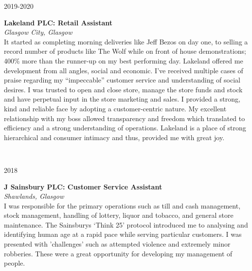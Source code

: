 \documentclass[a4, 10pt]{article}
\begin{document}
{\begin{minipage}[t]{.15\linewidth}
        \hfill 
        \textsc{2019-2020}
\end{minipage}
\hfill\vline\hfill
\begin{minipage}[t]{.80\linewidth}
        \textbf{Lakeland PLC: Retail Assistant}\\
        \textit{Glasgow City, Glasgow}\\ 
	It started as completing morning deliveries like Jeff Bezos on day one, to selling a record number of products like The Wolf while on front of house demonstrations; 400\% more than the runner-up on my best performing day. Lakeland offered me development from all angles, social and economic. I’ve received multiple cases of praise regarding my “impeccable” customer service and understanding of social desires. I was trusted to open and close store, manage the store funds and stock and have perpetual input in the store marketing and sales. I provided a strong, kind and reliable face by adopting a customer-centric nature. My excellent relationship with my boss allowed transparency and freedom which translated to efficiency and a strong understanding of operations. Lakeland is a place of strong hierarchical and consumer intimacy and thus, provided me with great joy.
\end{minipage}\\
\vspace{0.25cm}

\begin{minipage}[t]{.15\linewidth}
        \hfill                
        \textsc{2018}
\end{minipage}    
\hfill\vline\hfill                
\begin{minipage}[t]{.80\linewidth}                
	\textbf{J Sainsbury PLC: Customer Service Assistant}\\
        \textit{Shawlands, Glasgow}\\ 
	I was responsible for the primary operations such as till and cash management, stock management, handling of lottery, liquor and tobacco, and general store maintenance. The Sainsburys `Think 25' protocol introduced me to analysing and identifying human age at a rapid pace while serving particular customers. I was presented with 'challenges' such as attempted violence and extremely minor robberies. These were a great opportunity for developing my management of people.
\end{minipage}\\
\vspace{0.25cm}

}
\end{document}
